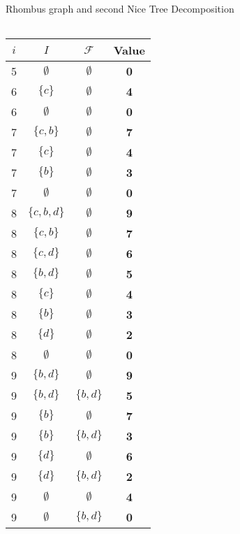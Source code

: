 \documentclass{beamer}
\begin{document}
\begin{frame}{Rhombus graph and second Nice Tree Decomposition}
\begin{minipage}{0.33\textwidth}
\begin{tabular}{|c| >{\footnotesize}c | >{\footnotesize}c | >{\footnotesize}c |}
    \hline
    \end{tabular}
  \end{minipage}
  \begin{minipage}{0.3\textwidth}
    \renewcommand{\arraystretch}{0.3} 
    \setlength{\tabcolsep}{0.7pt} 
    \begin{tabular}{|c| >{\footnotesize}c | >{\footnotesize}c | >{\footnotesize}c |}
    \hline
    \textbf{\(i\)} & \textbf{\(I\)} & \textbf{\(\mathcal{F}\)} & \textbf{Value} \\
    \hline
    5 & $\emptyset$ & $\emptyset$ & \textbf{0} \\
    \hline
    6 & $\{c\}$ & $\emptyset$ & \textbf{4} \\
    6 & $\emptyset$ & $\emptyset$ & \textbf{0} \\
    \hline
    7 & $\{c,b\}$ & $\emptyset$ & \textbf{7} \\
    7 & $\{c\}$ & $\emptyset$ & \textbf{4} \\
    7 & $\{b\}$ & $\emptyset$ & \textbf{3} \\
    7 & $\emptyset$ & $\emptyset$ & \textbf{0} \\
    \hline
    8 & $\{c,b,d\}$ & $\emptyset$ & \textbf{9} \\
    8 & $\{c,b\}$ & $\emptyset$ & \textbf{7} \\
    8 & $\{c,d\}$ & $\emptyset$ & \textbf{6} \\
    8 & $\{b,d\}$ & $\emptyset$ & \textbf{5} \\
    8 & $\{c\}$ & $\emptyset$ & \textbf{4} \\
    8 & $\{b\}$ & $\emptyset$ & \textbf{3} \\
    8 & $\{d\}$ & $\emptyset$ & \textbf{2} \\
    8 & $\emptyset$ & $\emptyset$ & \textbf{0} \\
    \hline
    9 & $\{b,d\}$ & $\emptyset$ & \textbf{9} \\
    9 & $\{b,d\}$ & $\{b,d\}$ & \textbf{5} \\
    9 & $\{b\}$ & $\emptyset$ & \textbf{7} \\
    9 & $\{b\}$ & $\{b,d\}$ & \textbf{3} \\
    9 & $\{d\}$ & $\emptyset$ & \textbf{6} \\
    9 & $\{d\}$ & $\{b,d\}$ & \textbf{2} \\
    9 & $\emptyset$ & $\emptyset$ & \textbf{4} \\
    9 & $\emptyset$ & $\{b,d\}$ & \textbf{0} \\
    \hline

\end{tabular}
\end{minipage}
\end{frame}
\end{document}
